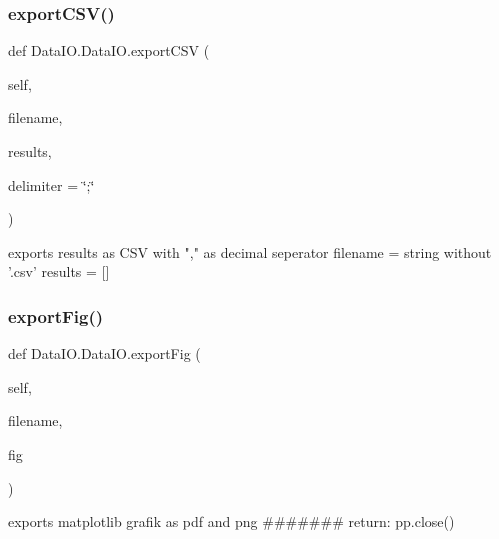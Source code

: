 \subsubsection{\texorpdfstring{export\+C\+S\+V()}{exportCSV()}}
{\footnotesize\ttfamily def Data\+I\+O.\+Data\+I\+O.\+export\+C\+SV (\begin{DoxyParamCaption}\item[{}]{self,  }\item[{}]{filename,  }\item[{}]{results,  }\item[{}]{delimiter = {\ttfamily \char`\"{};\char`\"{}} }\end{DoxyParamCaption})}

\begin{DoxyVerb}exports results as CSV with "," as decimal seperator
filename = string without '.csv'
results = []
\end{DoxyVerb}
 \mbox{\label{class_data_i_o_1_1_data_i_o_a4929b9de8bce15ad8e1fc432eb5167f9}} 
\subsubsection{\texorpdfstring{export\+Fig()}{exportFig()}}
{\footnotesize\ttfamily def Data\+I\+O.\+Data\+I\+O.\+export\+Fig (\begin{DoxyParamCaption}\item[{}]{self,  }\item[{}]{filename,  }\item[{}]{fig }\end{DoxyParamCaption})}

\begin{DoxyVerb}exports matplotlib grafik as pdf and png\n
#######\n
return:\n
    pp.close()
\end{DoxyVerb}
 \mbox{\label{class_data_i_o_1_1_data_i_o_aa79466ed985916b447e97c1b501ff30c}} 
